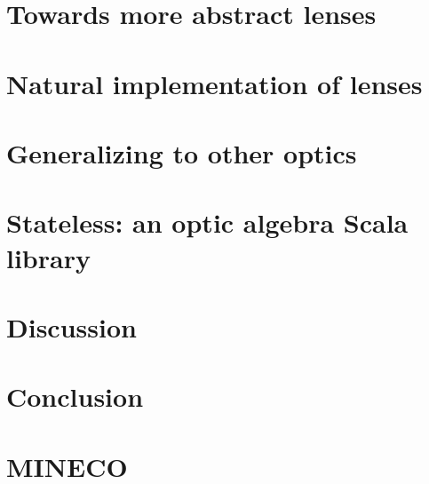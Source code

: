 \documentclass[final, twocolumn, 3p]{elsarticle}
\begin{document}

\section{Towards more abstract lenses}
\label{sec:Towards}

\section{Natural implementation of lenses}
\label{sec:Natural}

\section{Generalizing to other optics}
\label{sec:Generalizing}

\section{Stateless: an optic algebra Scala library}
\label{sec:Stateless}

\section{Discussion}
\label{sec:Discussion}

\section{Conclusion}

\section{MINECO}

{}

\end{document}

